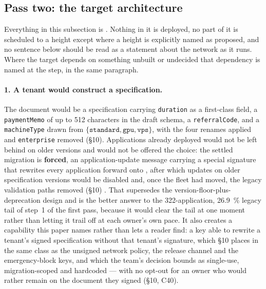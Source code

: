 \subsection{Pass two: the target architecture}
\label{sec:e2e:target}

Everything in this subsection is \planned. Nothing in it is deployed, no part of it is scheduled to a
height except where a height is explicitly named as proposed, and no sentence below should be read as
a statement about the network as it runs. Where the target depends on something unbuilt or undecided
that dependency is named at the step, in the same paragraph.

\paragraph{1. A tenant would construct a specification.}
The document would be a  specification carrying \texttt{duration} as a first-class field, a
\texttt{paymentMemo} of up to \num{512} characters in the draft schema, a \texttt{referralCode}, and
a \texttt{machineType} drawn from $\{\texttt{standard}, \texttt{gpu}, \texttt{vps}\}$, with the four
 renames applied and \texttt{enterprise} removed (\S10). Applications already deployed would
not be left behind on older versions and would not be offered the choice: the settled migration is
\textbf{forced}, an application-update message carrying a special signature that rewrites every
application forward onto , after which updates on older specification versions would be
disabled and, once the fleet had moved, the legacy validation paths removed (\S10)
. That supersedes the version-floor-plus-deprecation
design and is the better answer to the \num{322}-application, \SI{26.9}{\percent} legacy tail of
step~1 of the first pass, because it would clear the tail at one moment rather than letting it trail
off at each owner's own pace. It also creates a capability this paper names rather than lets a reader
find: a key able to rewrite a tenant's signed specification without that tenant's signature, which
\S10 places in the same class as the unsigned network policy, the release channel and the
emergency-block keys, and which the team's decision bounds as single-use, migration-scoped and
hardcoded --- with no opt-out for an owner who would rather remain on the document they signed
(\S10, C40).

